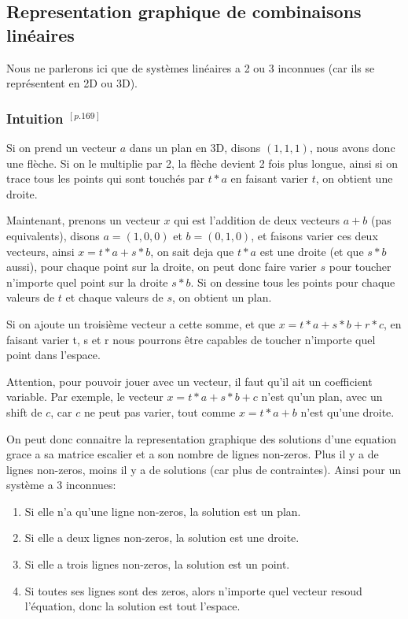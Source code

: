 \documentclass[12pt]{article}
\begin{document}
 
\subsection{Representation graphique de combinaisons linéaires}

Nous ne parlerons ici que de systèmes linéaires a 2 ou 3 inconnues (car ils se représentent en 2D ou 3D). 

\subsubsection{Intuition $^{[p.169]}$}
  
Si on prend un vecteur $a$ dans un plan en 3D, disons $(1,1,1)$, nous avons donc une flèche. Si on le multiplie par 2, la flèche devient 2 fois plus longue, ainsi si on trace tous les points qui sont touchés par $t*a$ en faisant varier  $t$, on obtient une droite.

Maintenant, prenons un vecteur $x$ qui est l'addition de deux vecteurs $a+b$ (pas equivalents), disons $a=(1,0,0)$ et $b=(0,1,0)$, et faisons varier ces deux vecteurs, ainsi $x= t*a + s*b$, on sait deja que $t*a$ est une droite (et que $s*b$ aussi), pour chaque point sur la droite, on peut donc faire varier $s$ pour toucher n'importe quel point sur la droite $s*b$. Si on dessine tous les points pour chaque valeurs de $t$ et chaque valeurs de $s$, on obtient un plan.

Si on ajoute un troisième vecteur a cette somme, et que $x = t*a + s*b + r*c$, en faisant varier t, s et r nous pourrons être capables de toucher n'importe quel point dans l'espace.  

Attention, pour pouvoir jouer avec un vecteur, il faut qu'il ait un coefficient variable. Par exemple, le vecteur $x = t*a + s*b + c$ n'est qu'un plan, avec un shift de $c$, car  $c$ ne peut pas varier, tout comme $x = t*a + b$ n'est qu'une droite.

On peut donc connaitre la representation graphique des solutions d'une equation grace a sa matrice escalier et a son nombre de lignes non-zeros. Plus il y a de lignes non-zeros, moins il y a de solutions (car plus de contraintes). Ainsi pour un système a 3 inconnues:
\begin{enumerate}
  \item Si elle n'a qu'une ligne non-zeros, la solution est un plan.
  \item  Si elle a deux lignes non-zeros, la solution est une droite.
  \item Si elle a trois lignes non-zeros, la solution est un point.
    \item Si toutes ses lignes sont des zeros, alors n'importe quel vecteur resoud l'équation, donc la solution est tout l'espace.
\end{enumerate}
\end{document}
